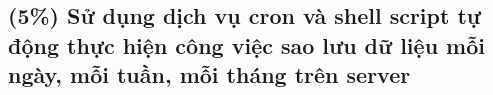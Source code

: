 \subsection{(5\%) Sử dụng dịch vụ cron và shell script tự động thực hiện công việc sao lưu
  dữ liệu mỗi ngày, mỗi tuần, mỗi tháng trên server}
\setcounter{figure}{0}
